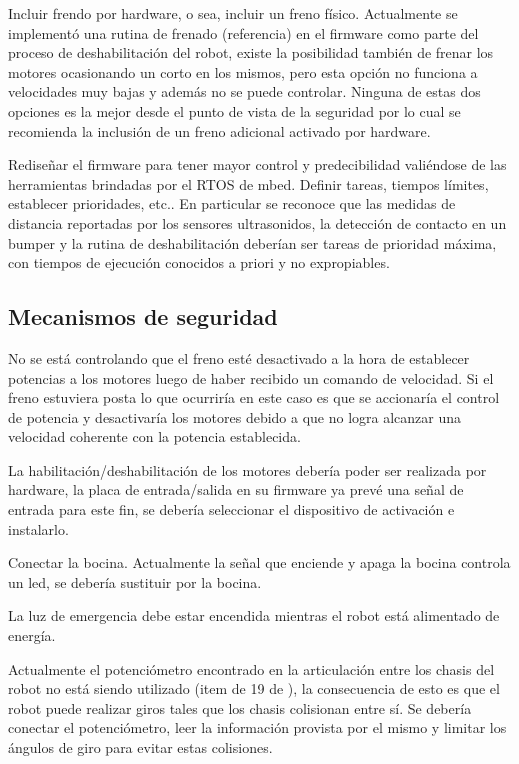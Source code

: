 \documentclass[withindex,glossary]{cam-thesis}
\begin{document}
Incluir frendo por hardware, o sea, incluir un freno físico. Actualmente se implementó una rutina de frenado (referencia) en el firmware como parte del proceso de deshabilitación del robot, existe la posibilidad también de frenar los motores ocasionando un corto en los mismos, pero esta opción no funciona a velocidades muy bajas y además no se puede controlar. Ninguna de estas dos opciones es la mejor desde el punto de vista de la seguridad por lo cual se recomienda la inclusión de un freno adicional activado por hardware.

Rediseñar el firmware para tener mayor control y predecibilidad valiéndose de las herramientas brindadas por el RTOS de mbed. Definir tareas, tiempos límites, establecer prioridades, etc.. En particular se reconoce que las medidas de distancia reportadas por los sensores ultrasonidos, la detección de contacto en un bumper y la rutina de deshabilitación deberían ser tareas de prioridad máxima, con tiempos de ejecución conocidos a priori y no expropiables.
\subsection{Mecanismos de seguridad}
No se está controlando que el freno esté desactivado a la hora de establecer potencias a los motores luego de haber recibido un comando de velocidad. Si el freno estuviera posta lo que ocurriría en este caso es que se accionaría el control de potencia y desactivaría los motores debido a que no logra alcanzar una velocidad coherente con la potencia establecida.

La habilitación/deshabilitación de los motores debería poder ser realizada por hardware, la placa de entrada/salida en su firmware ya prevé una señal de entrada para este fin, se debería seleccionar el dispositivo de activación e instalarlo.

Conectar la bocina. Actualmente la señal que enciende y apaga la bocina controla un led, se debería sustituir por la bocina. 

La luz de emergencia debe estar encendida mientras el robot está alimentado de energía.

Actualmente el potenciómetro encontrado en la articulación entre los chasis del robot no está siendo utilizado (item de 19 de \cite{fig:PrototipoDM33}), la consecuencia de esto es que el robot puede realizar giros tales que los chasis colisionan entre sí. Se debería conectar el potenciómetro, leer la información provista por el mismo y limitar los ángulos de giro para evitar estas colisiones.
\end{document}

